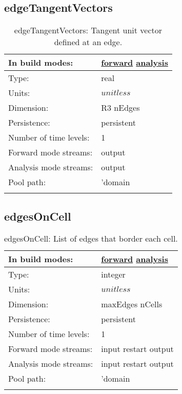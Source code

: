 \subsection[edgeTangentVectors]{edgeTangentVectors}
\label{subsec:var_sec_mesh_edgeTangentVectors}
\begin{center}
\begin{longtable}{| p{2.0in} | p{4.0in} |}
        \hline 
        In build modes: & \hyperref[subsec:forward_var_tab_mesh]{forward} \hyperref[subsec:analysis_var_tab_mesh]{analysis} \\
        \hline 
        Type: & real \\
        \hline 
        Units: & $unitless$ \\
        \hline 
        Dimension: & R3 nEdges \\
        \hline 
        Persistence: & persistent \\
        \hline 
        Number of time levels: & 1 \\
        \hline 
		 Forward mode streams: &  output \\
        \hline 
		 Analysis mode streams: &  output \\
        \hline 
            Pool path: & 'domain %
 \\
		 \hline 
    \caption{edgeTangentVectors: Tangent unit vector defined at an edge.}
\end{longtable}
\end{center}
\subsection[edgesOnCell]{edgesOnCell}
\label{subsec:var_sec_mesh_edgesOnCell}
\begin{center}
\begin{longtable}{| p{2.0in} | p{4.0in} |}
        \hline 
        In build modes: & \hyperref[subsec:forward_var_tab_mesh]{forward} \hyperref[subsec:analysis_var_tab_mesh]{analysis} \\
        \hline 
        Type: & integer \\
        \hline 
        Units: & $unitless$ \\
        \hline 
        Dimension: & maxEdges nCells \\
        \hline 
        Persistence: & persistent \\
        \hline 
        Number of time levels: & 1 \\
        \hline 
		 Forward mode streams: &  input restart output \\
        \hline 
		 Analysis mode streams: &  input restart output \\
        \hline 
            Pool path: & 'domain %
 \\
		 \hline 
    \caption{edgesOnCell: List of edges that border each cell.}
\end{longtable}
\end{center}
